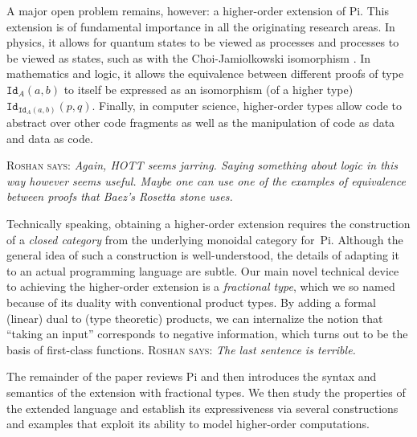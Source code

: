 \documentclass{llncs}
\newcommand{\roshan}[1]{\textsc{Roshan says:} 
  \textit{#1}
}
\begin{document}
A major open problem remains, however: a higher-order extension of
{{Pi}}. This extension is of fundamental importance in all the originating
research areas. 
In physics, it allows for quantum states to be viewed as processes and
processes to be viewed as states, such as with the Choi-Jamiolkowski
isomorphism \cite{choi1975completely,jamiolkowski1972linear}.  In
mathematics and logic, it allows the equivalence between different
proofs of type $\texttt{Id}_A(a,b)$ to itself be expressed as an
isomorphism (of a higher type)
$\texttt{Id}_{\texttt{Id}_A(a,b)}(p,q)$. Finally, in computer science,
higher-order types allow code to abstract over other code fragments as
well as the manipulation of code as data and data as code.

\roshan{Again, HOTT seems jarring. Saying something about logic in
  this way however seems useful. Maybe one can use one of the examples
  of equivalence between proofs that Baez's Rosetta stone uses. }

Technically speaking, obtaining a higher-order extension requires the
construction of a 
\emph{closed category} 
%
from the underlying monoidal
category for~{{Pi}}. Although the general idea of such a construction is
well-understood, the details of adapting it to an actual programming language
are subtle.  Our main novel
technical device to achieving the higher-order extension is a
\emph{fractional type}, which we so named because of its duality with
conventional product types.  By adding a formal (linear) dual to (type
theoretic) products, we can internalize the notion that ``taking an input''
corresponds to negative information, which turns out to be the basis of
first-class functions. \roshan{The last sentence is terrible.} 
The remainder of the paper reviews {{Pi}} and then
introduces the syntax and semantics of the extension with fractional
types. We then study the properties of the extended language and establish
its expressiveness via several constructions and examples that exploit its
ability to model higher-order computations.


\end{document}
